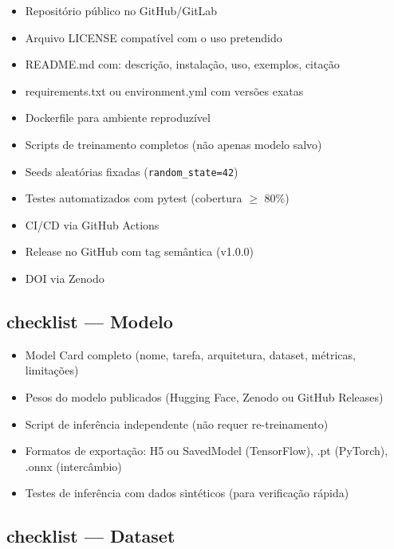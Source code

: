 \begin{itemize}
  \item[\checkmark] Repositório público no GitHub/GitLab
  \item[\checkmark] Arquivo LICENSE compatível com o uso pretendido
  \item[\checkmark] README.md com: descrição, instalação, uso, exemplos, citação
  \item[\checkmark] requirements.txt ou environment.yml com versões exatas
  \item[\checkmark] Dockerfile para ambiente reproduzível
  \item[\checkmark] Scripts de treinamento completos (não apenas modelo salvo)
  \item[\checkmark] Seeds aleatórias fixadas (\texttt{random\_state=42})
  \item[\checkmark] Testes automatizados com pytest (cobertura $\geq$ 80\%)
  \item[\checkmark] CI/CD via GitHub Actions
  \item[\checkmark] Release no GitHub com tag semântica (v1.0.0)
  \item[\checkmark] DOI via Zenodo
\end{itemize}

\subsection{ checklist — Modelo}

\begin{itemize}
  \item[\checkmark] Model Card completo (nome, tarefa, arquitetura, dataset, métricas, limitações)
  \item[\checkmark] Pesos do modelo publicados (Hugging Face, Zenodo ou GitHub Releases)
  \item[\checkmark] Script de inferência independente (não requer re-treinamento)
  \item[\checkmark] Formatos de exportação: H5 ou SavedModel (TensorFlow), .pt (PyTorch), .onnx (intercâmbio)
  \item[\checkmark] Testes de inferência com dados sintéticos (para verificação rápida)
\end{itemize}

\subsection{ checklist — Dataset}

